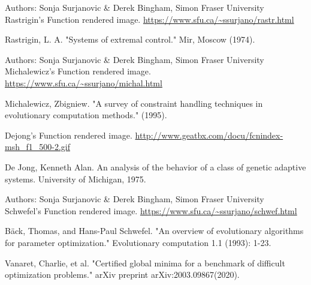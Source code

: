 \documentclass{article}
\begin{document}
\begin{thebibliography}{9}

Authors: Sonja Surjanovic \& Derek Bingham, Simon Fraser University \\ Rastrigin's Function rendered image.
  \url{https://www.sfu.ca/~ssurjano/rastr.html}

  Rastrigin, L. A. "Systems of extremal control." Mir, Moscow (1974).

Authors: Sonja Surjanovic \& Derek Bingham, Simon Fraser University \\ Michalewicz's Function rendered image.
  \url{https://www.sfu.ca/~ssurjano/michal.html}

    Michalewicz, Zbigniew. "A survey of constraint handling techniques in evolutionary computation methods." (1995).

Dejong's Function rendered image.
  \url{http://www.geatbx.com/docu/fcnindex-msh_f1_500-2.gif}

De Jong, Kenneth Alan. An analysis of the behavior of a class of genetic adaptive systems. University of Michigan, 1975.

Authors: Sonja Surjanovic \& Derek Bingham, Simon Fraser University \\ Schwefel's Function rendered image.
  \url{https://www.sfu.ca/~ssurjano/schwef.html}

Bäck, Thomas, and Hans-Paul Schwefel. "An overview of evolutionary algorithms for parameter optimization." Evolutionary computation 1.1 (1993): 1-23.

Vanaret, Charlie, et al. "Certified global minima for a benchmark of difficult optimization problems." arXiv preprint arXiv:2003.09867(2020).


\end{thebibliography} 
\end{document}
